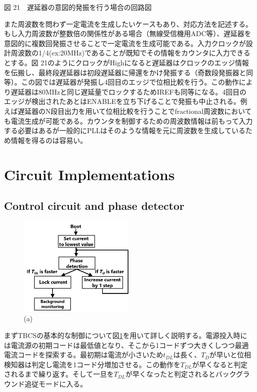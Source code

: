 \documentclass[letterpaper, 10 pt, conference]{ieeeconf}  %
\begin{document}
図 21　遅延器の意図的発振を行う場合の回路図

また周波数を問わず一定電流を生成したいケースもあり、対応方法を記述する。もし入力周波数が整数倍の関係性がある場合（無線受信機用ADC等）、遅延器を意図的に複数回発振させることで一定電流を生成可能である。入力クロックが設計周波数の1/4(ex:20MHz)であることが既知でその情報をカウンタに入力できるとする。図 21のようにクロックがHighになると遅延器はクロックのエッジ情報を伝搬し、最終段遅延器は初段遅延器に帰還をかけ発振する（奇数段発振器と同等）。この図では遅延器が発振し4回目のエッジで位相比較を行う。この動作により遅延器は80MHzと同じ遅延量でロックするためIREFも同等になる。4回目のエッジが検出されたあとはENABLEを立ち下げることで発振も中止される。例えば遅延器のN段目出力を用いて位相比較を行うことでfractional周波数においても電流生成が可能である。カウンタを制御するための周波数情報は前もって入力する必要はあるが一般的にPLLはそのような情報を元に周波数を生成しているため情報を得るのは容易い。

\section{Circuit Implementations}
\subsection{Control circuit and phase detector}
\begin{figure}[!]
\centering
 \includegraphics[width=0.5\textwidth]{figs/flowchart.png}
  \caption{(a) 
}
\label{flow}
\end{figure}
まずTBCSの基本的な制御について図\ref{flow}を用いて詳しく説明する。電源投入時には電流源の初期コードは最低値となり、そこから1コードずつ大きくしつつ最適電流コードを探索する。最初期は電流が小さいため$t_{DL}$は長く、$T_D$が早いと位相検知器は判定し電流を1コード分増加させる。この動作を$T_{DL}$が早くなると判定されるまで繰り返す。そして一旦を$T_{DL}$が早くなったと判定されるとバックグラウンド追従モードに入る。
\end{document}
